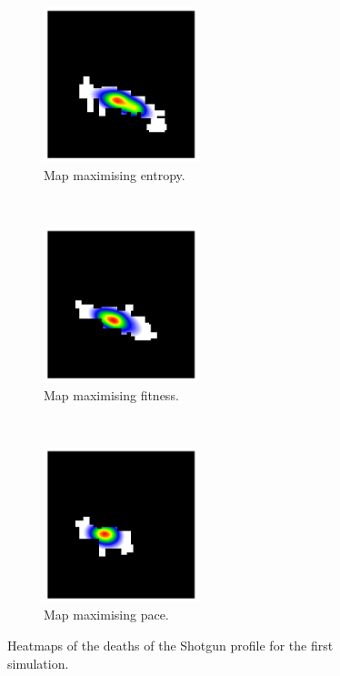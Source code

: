 \begin{figure}[H]
    \centering
    \begin{subfigure}[t]{0.3\textwidth}
        \centering
        \includegraphics[height=4.5cm]{Images/images/experiment_two/best_entropy_pop_0/deaths_bot_0.png}
        \caption{Map maximising entropy.}
    \end{subfigure}%
    ~ 
    \begin{subfigure}[t]{0.3\textwidth}
        \centering
        \includegraphics[height=4.5cm]{Images/images/experiment_two/best_fitness_pop_0/deaths_bot_0.png}
        \caption{Map maximising fitness.}
    \end{subfigure}
    ~ 
    \begin{subfigure}[t]{0.3\textwidth}
        \centering
        \includegraphics[height=4.5cm]{Images/images/experiment_two/best_pace_pop_0/deaths_bot_0.png}
        \caption{Map maximising pace.}
    \end{subfigure}
    \caption{Heatmaps of the deaths of the Shotgun profile for the first simulation.}
    \label{fig:ex_two_begin_heatmaps}
\end{figure}
